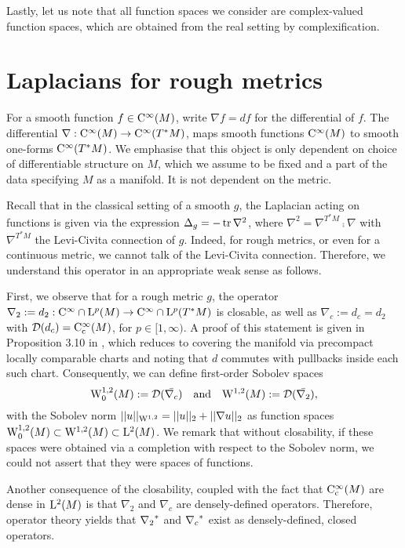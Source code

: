\documentclass[a4paper, 12pt]{amsart}
\begin{document}
Lastly, let us note that all function spaces we consider are complex-valued function spaces, which are obtained from the real setting by complexification.


\section{Laplacians for rough metrics}


For a smooth function \(f \in \Ck{\infty}(M)\), write \(\nabla f = df\) for the differential of \(f\). 
The differential \(\nabla : \Ck{\infty}(M) \to \Ck{\infty}(T^{\ast} M)\), maps smooth functions 
\(\Ck{\infty}(M)\) to smooth one-forms \(\Ck{\infty}(T^{\ast} M)\). 
We emphasise that this object is only dependent on choice of differentiable structure on $M$,
which we assume to be fixed and a part of the data specifying $M$ as a manifold. 
It is not dependent on the metric.

Recall that in the classical setting of a smooth $g$,  the Laplacian acting on functions 
is given  via the expression $\Delta_g = - \tr \nabla^2$, where $\nabla^2 = \nabla^{T^\ast M} \comp \nabla$
with $\nabla^{T^\ast M}$ the Levi-Civita connection of $g$. Indeed, for rough metrics, 
or even for a continuous metric, we cannot talk of the Levi-Civita connection. 
Therefore, we understand this operator in an appropriate weak sense as follows.

First, we observe that for a rough metric $g$, the operator
$\nabla_2 := d_2: \Ck{\infty} \cap \Lp{p}(M) \to \Ck{\infty} \cap \Lp{p}(T^\ast M)$
is closable, as well as $\nabla_c := d_c = d_2$ with $\dom(d_c) = \Ck[c]{\infty}(M)$,
for $p \in [1, \infty)$. A proof of this statement is given in Proposition 3.10 in \cite{BRough}, 
which reduces to covering the manifold via precompact locally comparable
charts and noting that $d$ commutes with pullbacks inside each such chart. 
Consequently, we can define first-order Sobolev spaces
$$ \SobH[0]{1}(M) := \dom(\bar{\nabla_c})\quad \text{and}\quad  \SobH{1}(M) := \dom(\bar{\nabla_2}),$$
with the Sobolev norm $||u||_{\SobH{1}} = ||u||_2 + ||\nabla u||_2$
as function spaces $\SobH[0]{1}(M) \subset \SobH{1}(M) \subset \Lp{2}(M)$.
We remark that without closability, if these spaces were obtained
via a completion with respect to the Sobolev norm, we could not 
assert that they were spaces of functions.

Another consequence of the closability, coupled with the 
fact that $\Ck[c]{\infty}(M)$ are dense in $\Lp{2}(M)$ 
is that $\nabla_2$ and $\nabla_c$ are densely-defined
operators. Therefore, operator theory yields 
that $\adj{\nabla_2}$ and $\adj{\nabla_c}$ exist
as densely-defined, closed operators.
\end{document}
